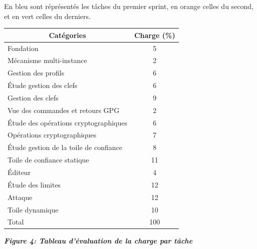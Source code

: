 \documentclass{../res/univ-projet}
\begin{document}
En bleu sont réprésentés les tâches du premier sprint, en orange celles du second, et en vert 
celles du derniers.
\begin{center}
  \begin{tabular}{|l|l|}
    \hline
    \multicolumn{1}{|c|}{\cellcolor{gray} \color{white}Catégories} & \multicolumn{1}{|c|}{\cellcolor{gray} \color{white}Charge (\%)} \\
    \hline
    \cellcolor{bleu}\color{white}Fondation & \multicolumn{1}{|c|}{\cellcolor{bleu}\color{white}5} \\
    \hline
    \cellcolor{bleu}\color{white}Mécanisme multi-instance & \multicolumn{1}{|c|}{\cellcolor{bleu}\color{white}2} \\    
    \hline
    \cellcolor{bleu}\color{white}Gestion des profils & \multicolumn{1}{|c|}{\cellcolor{bleu}\color{white}6} \\
    \hline
    \cellcolor{bleu}\color{white}\'{E}tude gestion des clefs & \multicolumn{1}{|c|}{\cellcolor{bleu}\color{white}6} \\
    \hline
    \cellcolor{bleu}\color{white}Gestion des clefs & \multicolumn{1}{|c|}{\cellcolor{bleu}\color{white}9} \\
    \hline
    \cellcolor{bleu}\color{white}Vue des commandes et retours GPG & \multicolumn{1}{|c|}{\cellcolor{bleu}\color{white}2} \\
    \hline
    \cellcolor{orange}\color{white}\'{E}tude des opérations cryptographiques & \multicolumn{1}{|c|}{\cellcolor{orange}\color{white}6} \\
    \hline
    \cellcolor{orange}\color{white}Opérations cryptographiques & \multicolumn{1}{|c|}{\cellcolor{orange}\color{white}7} \\
    \hline
    \cellcolor{orange}\color{white}\'{E}tude gestion de la toile de confiance & \multicolumn{1}{|c|}{\cellcolor{orange}\color{white}8} \\
    \hline
    \cellcolor{orange}\color{white}Toile de confiance statique & \multicolumn{1}{|c|}{\cellcolor{orange}\color{white}11} \\
    \hline
    \cellcolor{orange}\color{white}\'{E}diteur & \multicolumn{1}{|c|}{\cellcolor{orange}\color{white}4} \\
    \hline
    \cellcolor{vert}\color{white}\'{E}tude des limites & \multicolumn{1}{|c|}{\cellcolor{vert}\color{white}12} \\
    \hline
    \cellcolor{vert}\color{white}Attaque & \multicolumn{1}{|c|}{\cellcolor{vert}\color{white}12} \\
    \hline
    \cellcolor{vert}\color{white}Toile dynamique & \multicolumn{1}{|c|}{\cellcolor{vert}\color{white}10} \\
    \hline
    Total & \multicolumn{1}{|c|}{100} \\
    \hline
  \end{tabular}
\end{center}
\begin{center}
 \textbf{\textit{Figure 4: Tableau d'évaluation de la charge par tâche}}
\end{center}
\end{document}
